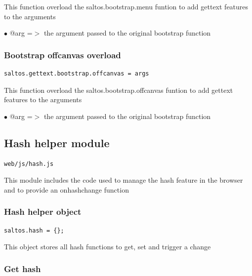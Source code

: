 \documentclass[a4paper]{article}
\begin{document}
This function overload the saltos.bootstrap.menu funtion to add gettext
features to the arguments

\begin{compactitem}
\item[\color{myblue}$\bullet$] @arg =$>$ the argument passed to the original bootstrap function
\end{compactitem}

\hypertarget{toc248}{}
\subsubsection{Bootstrap offcanvas overload}

\begin{lstlisting}
saltos.gettext.bootstrap.offcanvas = args
\end{lstlisting}

This function overload the saltos.bootstrap.offcanvas funtion to add gettext
features to the arguments

\begin{compactitem}
\item[\color{myblue}$\bullet$] @arg =$>$ the argument passed to the original bootstrap function
\end{compactitem}

\hypertarget{toc249}{}
\subsection{Hash helper module}

\begin{lstlisting}
web/js/hash.js
\end{lstlisting}

This module includes the code used to manage the hash feature in the browser
and to provide an onhashchange function

\hypertarget{toc250}{}
\subsubsection{Hash helper object}

\begin{lstlisting}
saltos.hash = {};
\end{lstlisting}

This object stores all hash functions to get, set and trigger a change

\hypertarget{toc251}{}
\subsubsection{Get hash}
\end{document}
